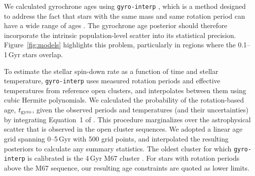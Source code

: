 \documentclass[11pt,twocolumn,tighten,linenumbers,trackchanges]{aastex63}
\begin{document}
We calculated gyrochrone ages using \texttt{gyro-interp}
\citep[][]{Bouma_2023}, which is a method designed to address the fact
that stars with the same mass and same rotation period can have a wide
range of ages \citep[e.g.][]{Gallet_Bouvier_2015}.  The gyrochrone age
posterior should therefore incorporate the intrinsic population-level
scatter into its statistical precision.  Figure~\ref{fig:models}
highlights this problem, particularly in regions where the 0.1--1\,Gyr
stars overlap.

To estimate the stellar spin-down rate as a function of time and
stellar temperature, \texttt{gyro-interp} uses measured rotation
periods and effective temperatures from reference open clusters, and
interpolates between them using cubic Hermite polynomials.  We
calculated the probability of the rotation-based age, $t_{\rm gyro}$,
given the observed periods and temperatures (and their uncertainties)
by integrating Equation~1 of \citet{Bouma_2023}.  This procedure
marginalizes over the astrophysical scatter that is observed in the
open cluster sequences.  We adopted a linear age grid spanning
0--5\,Gyr with 500 grid points, and interpolated the resulting
posteriors to calculate any summary statistics.  The oldest cluster
for which \texttt{gyro-interp} is calibrated is the 4\,Gyr M67 cluster
\citep[][]{Dungee_2022,Gruner_2023}.  For stars with rotation
periods above the M67 sequence, our resulting age constraints are quoted as lower limits.

	
\end{document}
